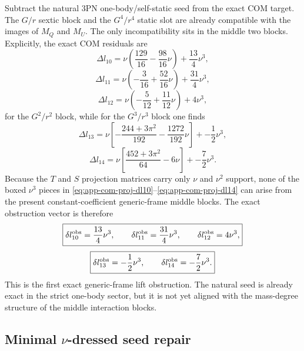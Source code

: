\documentclass[11pt]{article}
\begin{document}
Subtract the natural $3$PN one-body/self-static seed from the exact COM target.
The $G/r$ sextic block and the $G^4/r^4$ static slot are already compatible with
the images of $M_Q$ and $M_U$.  The only incompatibility sits in the middle two
blocks.  Explicitly, the exact COM residuals are
\begin{equation}
\Delta l_{10}
=
\nu\left(\frac{129}{16}-\frac{98}{16}\nu\right)+\boxed{\frac{13}{4}\nu^3},
\label{eq:app-com-proj-dl10}
\end{equation}
\begin{equation}
\Delta l_{11}
=
\nu\left(-\frac{3}{16}+\frac{52}{16}\nu\right)+\boxed{\frac{31}{4}\nu^3},
\label{eq:app-com-proj-dl11}
\end{equation}
\begin{equation}
\Delta l_{12}
=
\nu\left(-\frac{5}{12}+\frac{11}{12}\nu\right)+\boxed{4\nu^3},
\label{eq:app-com-proj-dl12}
\end{equation}
for the $G^2/r^2$ block, while for the $G^3/r^3$ block one finds
\begin{equation}
\Delta l_{13}
=
\nu\left[-\frac{244+3\pi^2}{192}-\frac{1272}{192}\nu\right]+\boxed{-\frac12\nu^3},
\label{eq:app-com-proj-dl13}
\end{equation}
\begin{equation}
\Delta l_{14}
=
\nu\left[\frac{452+3\pi^2}{64}-6\nu\right]+\boxed{-\frac72\nu^3}.
\label{eq:app-com-proj-dl14}
\end{equation}
Because the $T$ and $S$ projection matrices carry only $\nu$ and $\nu^2$ support,
none of the boxed $\nu^3$ pieces in
\eqref{eq:app-com-proj-dl10}--\eqref{eq:app-com-proj-dl14} can arise from the
present constant-coefficient generic-frame middle blocks.  The exact obstruction
vector is therefore
\begin{equation}
\boxed{
\delta l_{10}^{\rm obs}=\frac{13}{4}\nu^3,
\qquad
\delta l_{11}^{\rm obs}=\frac{31}{4}\nu^3,
\qquad
\delta l_{12}^{\rm obs}=4\nu^3,}
\label{eq:app-com-proj-T-obstruction}
\end{equation}
\begin{equation}
\boxed{
\delta l_{13}^{\rm obs}=-\frac12\nu^3,
\qquad
\delta l_{14}^{\rm obs}=-\frac72\nu^3.}
\label{eq:app-com-proj-S-obstruction}
\end{equation}
This is the first exact generic-frame lift obstruction.  The natural seed is
already exact in the strict one-body sector, but it is not yet aligned with the
mass-degree structure of the middle interaction blocks.

\subsection{Minimal \texorpdfstring{$\nu$}{nu}-dressed seed repair}
\label{app:com-proj-seed-repair}
\end{document}
